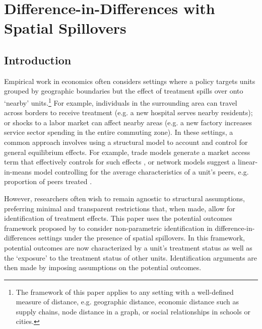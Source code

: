 \chapter{Difference-in-Differences with Spatial Spillovers}

\section{Introduction}

Empirical work in economics often considers settings where a policy targets units grouped by geographic boundaries but the effect of treatment spills over onto `nearby' units.\footnote{The framework of this paper applies to any setting with a well-defined measure of distance, e.g. geographic distance, economic distance such as supply chains, node distance in a graph, or social relationships in schools or cities.} For example, individuals in the surrounding area can travel across borders to receive treatment (e.g. a new  hospital serves nearby residents); or shocks to a labor market can affect nearby areas (e.g. a new factory increases service sector spending in the entire commuting zone). In these settings, a common approach involves using a structural model to account and control for general equilibrium effects. For example, trade models generate a market access term that effectively controls for such effects \citep{Donaldson_Hornbeck_2016}, or network models suggest a linear-in-means model controlling for the average characteristics of a unit's peers, e.g. proportion of peers treated \citep{manski1993identification,goldsmith2013social,Miguel_Kremer_2004}. 

However, researchers often wish to remain agnostic to structural assumptions, preferring minimal and transparent restrictions that, when made, allow for identification of treatment effects. This paper uses the potential outcomes framework proposed by \citet{vazquez2023identification} to consider non-parametric identification in difference-in-differences settings under the presence of spatial spillovers. In this framework, potential outcomes are now characterized by a unit's treatment status as well as the `exposure' to the treatment status of other units. Identification arguments are then made by imposing assumptions on the potential outcomes. 

